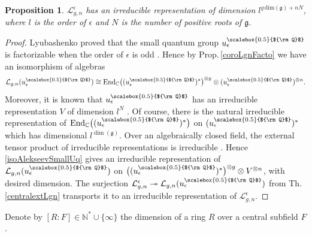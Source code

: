 \documentclass[11pt]{amsart}
\newtheorem{prop}[teo]{Proposition}
\newcommand{\e}{\epsilon}
\newcommand{\Q}{{\scalebox{0.5}{${\rm Q}$}}}
\begin{document}
\begin{prop}\label{irrep} $\mathcal{L}_{g,n}^{\e}$ has an irreducible representation of dimension $l^{g\,\mathrm{dim}(\mathfrak{g})+nN}$, where $l$ is the order of $\e$ and $N$ is the number of positive roots of $\mathfrak{g}$.
\end{prop}
\begin{proof}
Lyubashenko proved that the small quantum group $u_\e^\Q$ is factorizable when the order of $\e$ is odd  \cite[Cor.\,A.3.3]{Lyub95}. Hence by Prop.\,\ref{coroLgnFacto} we have an isomorphism of algebras
\begin{equation}\label{isoAlekseevSmallUq}
\mathcal{L}_{g,n}(u_\epsilon^\Q) \cong \mathrm{End}_{\mathbb{C}}\bigl( (u_\e^\Q)^* \bigr)^{\otimes g} \otimes (u_\e^\Q)^{\otimes n}.
\end{equation}
Moreover, it is known that $u_\e^\Q$ has an irreducible representation $V$ of dimension $l^N$ \cite[\S III.6.6]{BG}. Of course, there is the natural irreducible representation of $\mathrm{End}_{\mathbb{C}}\bigl( (u_\e^\Q)^* \bigr)$ on $(u_\e^\Q)^*$ which has dimensional $l^{\dim(\mathfrak{g})}$. Over an algebraically closed field, the external tensor product of irreducible representations is irreducible \cite[\S 3.10]{Et}. Hence \eqref{isoAlekseevSmallUq} gives an irreducible representation of $\mathcal{L}_{g,n}(u_\epsilon^\Q)$ on $\bigl( (u_\e^\Q)^* \bigr)^{\otimes g} \otimes V^{\otimes n}$, with desired dimension. The surjection $\mathcal{L}_{g,n}^\e \twoheadrightarrow \mathcal{L}_{g,n}(u_\e^\Q)$ from Th.\,\ref{centralextLgn} transports it to an irreducible representation of $\mathcal{L}_{g,n}^\e$.
\end{proof} 

\indent Denote by $[R:F] \in \mathbb{N}^* \cup \{\infty\}$ the dimension of a ring $R$ over a central subfield $F$.
\end{document}
